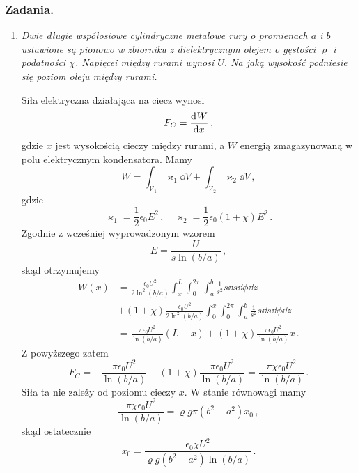 \documentclass[../main.tex]{subfiles}
\begin{document}
\subsubsection*{Zadania.}
\begin{enumerate}
    \item \textit{Dwie długie współosiowe cylindryczne metalowe rury o promienach \(a\) i \(b\) ustawione są pionowo w zbiorniku z dielektrycznym olejem o gęstości \(\varrho\) i podatności \(\chi\). Napięcei między rurami wynosi \(U\). Na jaką wysokość podniesie się poziom oleju między rurami.}
    \medskip
    
    Siła elektryczna działająca na ciecz wynosi
    \begin{equation*}
        F_C=\dv[]{W}{x}\,,
    \end{equation*}
    gdzie \(x\) jest wysokością cieczy między rurami, a \(W\) energią zmagazynowaną w polu elektrycznym kondensatora. Mamy
    \begin{equation*}
        W=\int_{\mathcal{V}_1}\varkappa_1\dd{V}+\int_{\mathcal{V}_2}\varkappa_2\dd{V}\,,
    \end{equation*}
    gdzie
    \begin{equation*}
        \varkappa_1=\frac{1}{2}\epsilon_0E^2\,,\quad \varkappa_2=\frac{1}{2}\epsilon_0(1+\chi)E^2\,.
    \end{equation*}
    Zgodnie z wcześniej wyprowadzonym wzorem
    \begin{equation*}
        E=\frac{U}{s\ln(b/a)}\,,
    \end{equation*}
    skąd otrzymujemy
    \begin{equation*}
    \begin{split}
        W(x)&=\frac{\epsilon_0U^2}{2\ln^2(b/a)}\int_x^{L}\int_0^{2\pi}\int_a^b\frac{1}{s^2}s\dd{s}\dd{\phi}\dd{z}\\
        &+(1+\chi)\frac{\epsilon_0U^2}{2\ln^2(b/a)}\int_0^{x}\int_0^{2\pi}\int_a^b\frac{1}{s^2}s\dd{s}\dd{\phi}\dd{z}\\
        &=\frac{\pi\epsilon_0U^2}{\ln(b/a)}(L-x)+(1+\chi)\frac{\pi\epsilon_0U^2}{\ln(b/a)}x\,.
    \end{split}
    \end{equation*}
    Z powyższego zatem
    \begin{equation*}
        F_C=-\frac{\pi\epsilon_0U^2}{\ln(b/a)}+(1+\chi)\frac{\pi\epsilon_0U^2}{\ln(b/a)}=\frac{\pi\chi\epsilon_0U^2}{\ln(b/a)}\,.
    \end{equation*}
    Siła ta nie zależy od poziomu cieczy \(x\). W stanie równowagi mamy
    \begin{equation*}
        \frac{\pi\chi\epsilon_0U^2}{\ln(b/a)}=\varrho g\pi(b^2-a^2)x_0\,,
    \end{equation*}
    skąd ostatecznie
    \begin{equation*}
        x_0=\frac{\epsilon_0\chi U^2}{\varrho g(b^2-a^2)\ln(b/a)}\,.
    \end{equation*}
\end{enumerate}
\pagebreak
\end{document}
